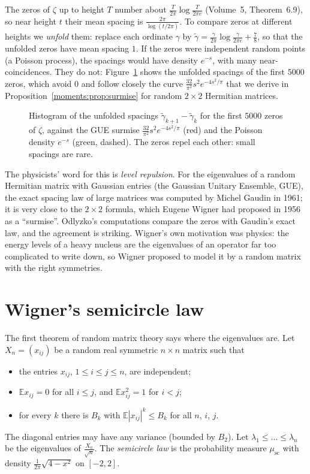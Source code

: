 The zeros of $\zeta$ up to height $T$ number about $\frac T{2\pi}\log\frac T{2\pi e}$ (Volume~5, Theorem~6.9), so near height $t$ their mean spacing is
$\frac{2\pi}{\log(t/2\pi)}$. To compare zeros at different heights we \emph{unfold} them: replace each ordinate $\gamma$ by
$\tilde\gamma=\frac\gamma{2\pi}\log\frac\gamma{2\pi e}+\frac78$, so that the unfolded zeros have mean spacing $1$. If the zeros were independent random points
(a Poisson process), the spacings would have density $e^{-s}$, with many near-coincidences. They do not: Figure~\ref{moments:fig:spacings} shows the unfolded
spacings of the first $5000$ zeros, which avoid $0$ and follow closely the curve $\frac{32}{\pi^2}s^2e^{-4s^2/\pi}$ that we derive in
Proposition~\ref{moments:prop:surmise} for random $2\times2$ Hermitian matrices.

\begin{figure}[ht]
\centering
{}
\caption{Histogram of the unfolded spacings $\tilde\gamma_{k+1}-\tilde\gamma_k$ for the first $5000$ zeros of $\zeta$, against the GUE surmise
$\frac{32}{\pi^2}s^2e^{-4s^2/\pi}$ (red) and the Poisson density $e^{-s}$ (green, dashed). The zeros repel each other: small spacings are rare.}
\label{moments:fig:spacings}
\end{figure}

The physicists' word for this is \emph{level repulsion}. For the eigenvalues of a random Hermitian matrix with Gaussian entries (the Gaussian Unitary
Ensemble, GUE), the exact spacing law of large matrices was computed by Michel Gaudin in 1961; it is very close to the $2\times2$ formula, which Eugene
Wigner had proposed in 1956 as a ``surmise''. Odlyzko's computations compare the zeros with Gaudin's exact law, and the agreement is striking. Wigner's own motivation was physics: the energy levels of a heavy nucleus are the eigenvalues of an operator far too
complicated to write down, so Wigner proposed to model it by a random matrix with the right symmetries.

\section{Wigner's semicircle law}

The first theorem of random matrix theory says where the eigenvalues are. Let $X_n=(x_{ij})$ be a random real symmetric $n\times n$ matrix such that
\begin{itemize}
\item the entries $x_{ij}$, $1\le i\le j\le n$, are independent;
\item $\mathbb Ex_{ij}=0$ for all $i\le j$, and $\mathbb Ex_{ij}^2=1$ for $i<j$;
\item for every $k$ there is $B_k$ with $\mathbb E|x_{ij}|^k\le B_k$ for all $n$, $i$, $j$.
\end{itemize}
The diagonal entries may have any variance (bounded by $B_2$). Let $\lambda_1\le\dots\le\lambda_n$ be the eigenvalues of $\frac{X_n}{\sqrt n}$. The
\emph{semicircle law} is the probability measure $\mu_{\mathrm{sc}}$ with density $\frac1{2\pi}\sqrt{4-x^2}$ on $[-2,2]$.

